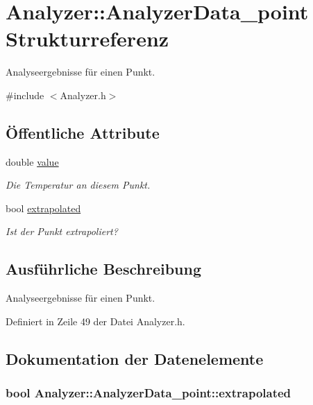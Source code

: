 \hypertarget{structAnalyzer_1_1AnalyzerData__point}{\section{Analyzer\-:\-:Analyzer\-Data\-\_\-point Strukturreferenz}
\label{structAnalyzer_1_1AnalyzerData__point}
}


Analyseergebnisse für einen Punkt.  




{\ttfamily \#include $<$Analyzer.\-h$>$}

\subsection*{Öffentliche Attribute}
\begin{DoxyCompactItemize}
\item 
double \hyperlink{structAnalyzer_1_1AnalyzerData__point_a150b00a3d0be5d1c75b39292d213cbfa}{value}
\begin{DoxyCompactList}\small\item\em Die Temperatur an diesem Punkt. \end{DoxyCompactList}\item 
bool \hyperlink{structAnalyzer_1_1AnalyzerData__point_af4d2c2bd41aebc3c243afc5544bed81a}{extrapolated}
\begin{DoxyCompactList}\small\item\em Ist der Punkt extrapoliert? \end{DoxyCompactList}\end{DoxyCompactItemize}


\subsection{Ausführliche Beschreibung}
Analyseergebnisse für einen Punkt. 

Definiert in Zeile 49 der Datei Analyzer.\-h.



\subsection{Dokumentation der Datenelemente}
\hypertarget{structAnalyzer_1_1AnalyzerData__point_af4d2c2bd41aebc3c243afc5544bed81a}{
\subsubsection[{extrapolated}]{\setlength{\rightskip}{0pt plus 5cm}bool Analyzer\-::\-Analyzer\-Data\-\_\-point\-::extrapolated}}\label{structAnalyzer_1_1AnalyzerData__point_af4d2c2bd41aebc3c243afc5544bed81a}


